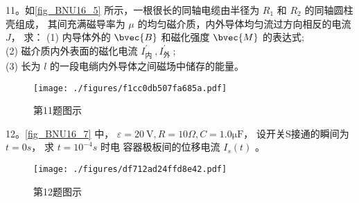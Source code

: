 11。如\autoref{fig_BNU16_5} 所示，一根很长的同轴电缆由半径为 $R_{1}$ 和 $R_{2}$ 的同轴圆柱壳组成， 其间充满磁导率为 $\mu$ 的均匀磁介质，内外导体均匀流过方向相反的电流 $J$， 求：
(1) 内导体外的 $\bvec{B}$ 和磁化强度 $\bvec{M}$ 的表达式;\\
(2) 磁介质内外表面的磁化电流 $I_{\text {内 }}^{\prime}, I_{\text {外 }}^{\prime}$;\\
(3) 长为 $l$ 的一段电绱内外导体之间磁场中储存的能量。
\begin{figure}[ht]
\centering
\texttt{[image: ./figures/f1cc0db507fa685a.pdf]}
\caption{第11题图示} \label{fig_BNU16_5}
\end{figure}
12。\autoref{fig_BNU16_7} 中， $\varepsilon=20 \mathrm{~V}, R=10 \Omega, C=1.0\mathrm{\mu F}$， 设开关S接通的瞬间为 $t=0 s$， 求 $t=10^{-4} s$ 时电 容器极板间的位移电流 $I_{s}(t)$ 。
\begin{figure}[ht]
\centering
\texttt{[image: ./figures/df712ad24ffd8e42.pdf]}
\caption{第12题图示} \label{fig_BNU16_7}
\end{figure}
